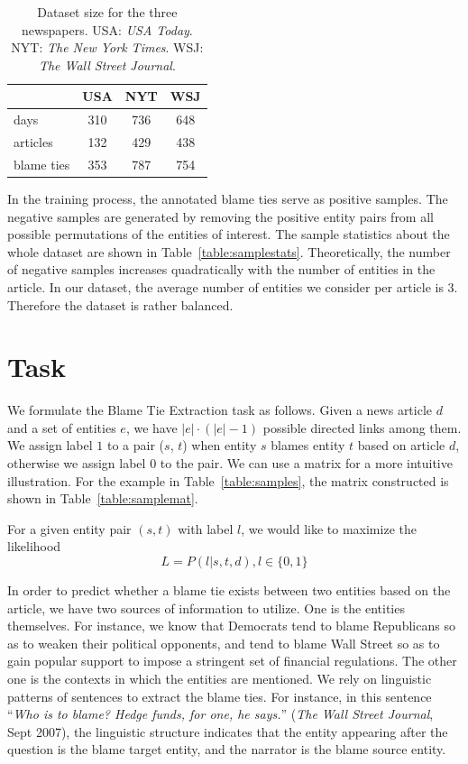 \documentclass[letterpaper]{article} %
\begin{document}
\begin{table}[t]
\centering
\begin{tabular}{l c c c} 
 \hline
 & {\bf USA} &  {\bf NYT}  & {\bf WSJ} \\ 
 \hline\hline
 days & 310 & 736 & 648 \\ 
 articles & 132 & 429 & 438 \\
 blame ties & 353 & 787 & 754 \\
 \hline
\end{tabular}
\caption{Dataset size for the three newspapers. USA: {\it USA Today}. NYT: {\it The New York Times}. WSJ: {\it The Wall Street Journal}.}
\label{table:dataset}
\end{table}

In the training process, the annotated blame ties serve as positive samples. The negative samples are generated by removing the positive entity pairs from all possible permutations of the entities of interest. The sample statistics about the whole dataset are shown in Table~\ref{table:samplestats}. Theoretically, the number of negative samples increases quadratically with the number of entities in the article. In our dataset, the average number of entities we consider per article is 3. Therefore the dataset is rather balanced.

\section{Task}

We formulate the Blame Tie Extraction task as follows. Given a news article $d$ and a set of entities $e$, we have $ |e| \cdot (|e| - 1)$ possible directed links among them. We assign label $1$ to a pair ($s$, $t$) when entity $s$ blames entity $t$ based on article $d$, otherwise we assign label $0$ to the pair. We can use a matrix for a more intuitive illustration. For the example in Table~\ref{table:samples}, the matrix constructed is shown in Table~\ref{table:samplemat}.

For a given entity pair $(s, t)$ with label $l$, we would like to maximize the likelihood $$L = P(l | s, t, d), l \in \{0, 1\}$$

In order to predict whether a blame tie exists between two entities based on the article, we have two sources of information to utilize. One is the entities themselves. For instance, we know that Democrats tend to blame Republicans so as to weaken their political opponents, and tend to blame Wall Street so as to gain popular support to impose a stringent set of financial regulations. The other one is the contexts in which the entities are mentioned. We rely on linguistic patterns of sentences to extract the blame ties. For instance, in this sentence ``{\it Who is to blame? Hedge funds, for one, he says.}'' ({\it The Wall Street Journal}, Sept 2007), the linguistic structure indicates that the entity appearing after the question is the blame target entity, and the narrator is the blame source entity.
\end{document}
